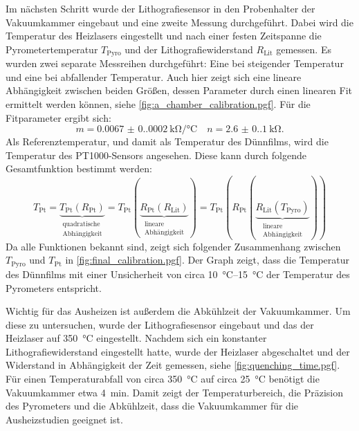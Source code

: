 Im nächsten Schritt wurde der Lithografiesensor in den Probenhalter der Vakuumkammer eingebaut und eine
zweite Messung durchgeführt.
Dabei wird die Temperatur des Heizlasers eingestellt und nach einer festen Zeitspanne die Pyrometertemperatur
$T_\mathrm{Pyro}$ und der Lithografiewiderstand $R_\mathrm{Lit}$ gemessen.
Es wurden zwei separate Messreihen durchgeführt: Eine bei steigender Temperatur und eine bei abfallender Temperatur.
Auch hier zeigt sich eine lineare Abhängigkeit zwischen beiden Größen, dessen Parameter durch einen linearen Fit
ermittelt werden können, siehe \cref{fig:a_chamber_calibration.pgf}.
Für die Fitparameter ergibt sich:
\begin{equation*}
    m = \qty{0.0067(0.0002)}{\kilo\ohm\per\degreeCelsius} \quad n = \qty{2.6(0.1)}{\kilo\ohm}.
\end{equation*}
Als Referenztemperatur, und damit als Temperatur des Dünnfilms, wird die Temperatur des PT1000-Sensors angesehen.
Diese kann durch folgende Gesamtfunktion bestimmt werden:
\begin{equation}
    T_{\mathrm{Pt}}=\underbrace{ T_{\mathrm{Pt}}(R_{\mathrm{Pt}}) }_{
        \substack{\text{quadratische} \\ \text{Abhängigkeit}}}
    =T_{\mathrm{Pt}}(\underbrace{ R_{\mathrm{Pt}}(R_{\mathrm{Lit}}) }_{
        \substack{\text{lineare} \\ \text{Abhängigkeit}}  })
    =T_{\mathrm{Pt}}(R_{\mathrm{Pt}}(\underbrace{ R_{\mathrm{Lit}}(T_{\mathrm{Pyro}}) }_{
        \substack{\text{lineare} \\ \text{Abhängigkeit}}  }))
    \label{eq:temperature_calibration}
\end{equation}
Da alle Funktionen bekannt sind, zeigt sich folgender Zusammenhang zwischen $T_{\mathrm{Pyro}}$ und $T_{\mathrm{Pt}}$
in \cref{fig:final_calibration.pgf}.
Der Graph zeigt, dass die Temperatur des Dünnfilms mit einer Unsicherheit von circa \qtyrange{10}{15}{\degreeCelsius}
der Temperatur des Pyrometers entspricht.

Wichtig für das Ausheizen ist außerdem die Abkühlzeit der Vakuumkammer.
Um diese zu untersuchen, wurde der Lithografiesensor eingebaut und das der Heizlaser auf \qty{350}{\degreeCelsius}
eingestellt.
Nachdem sich ein konstanter Lithografiewiderstand eingestellt hatte, wurde der Heizlaser abgeschaltet und der
Widerstand in Abhängigkeit der Zeit gemessen, siehe \cref{fig:quenching_time.pgf}.
Für einen Temperaturabfall von circa \qty{350}{\degreeCelsius} auf circa \qty{25}{\degreeCelsius}
benötigt die Vakuumkammer etwa \qty{4}{\minute}.
Damit zeigt der Temperaturbereich, die Präzision des Pyrometers und die Abkühlzeit, dass
die Vakuumkammer für die Ausheizstudien geeignet ist.

